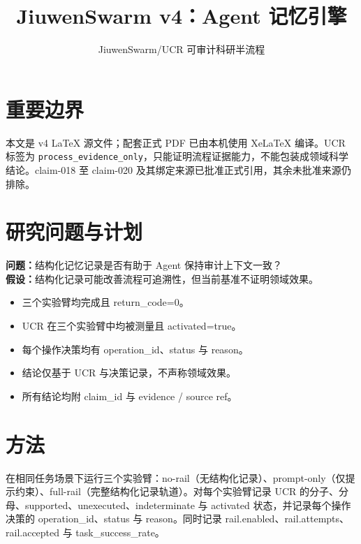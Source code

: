 \documentclass[UTF8]{ctexart}
\title{JiuwenSwarm v4：Agent 记忆引擎}
\author{JiuwenSwarm/UCR 可审计科研半流程}
\date{}
\begin{document}
\maketitle
\section{重要边界}
本文是 v4 LaTeX 源文件；配套正式 PDF 已由本机使用 XeLaTeX 编译。UCR 标签为 \texttt{process\_evidence\_only}，只能证明流程证据能力，不能包装成领域科学结论。claim-018 至 claim-020 及其绑定来源已批准正式引用，其余未批准来源仍排除。
\section{研究问题与计划}
\textbf{问题：}结构化记忆记录是否有助于 Agent 保持审计上下文一致？\\
\textbf{假设：}结构化记录可能改善流程可追溯性，但当前基准不证明领域效果。
\begin{itemize}
\item 三个实验臂均完成且 return\_\allowbreak{}code=0。
\item UCR 在三个实验臂中均被测量且 activated=true。
\item 每个操作决策均有 operation\_\allowbreak{}id、status 与 reason。
\item 结论仅基于 UCR 与决策记录，不声称领域效果。
\item 所有结论均附 claim\_\allowbreak{}id 与 evidence / source ref。
\end{itemize}
\section{方法}
在相同任务场景下运行三个实验臂：no-\allowbreak{}rail（无结构化记录）、prompt-\allowbreak{}only（仅提示约束）、full-\allowbreak{}rail（完整结构化记录轨道）。对每个实验臂记录 UCR 的分子、分母、supported、unexecuted、indeterminate 与 activated 状态，并记录每个操作决策的 operation\_\allowbreak{}id、status 与 reason。同时记录 rail.enabled、rail.attempts、rail.accepted 与 task\_\allowbreak{}success\_\allowbreak{}rate。
\end{document}
